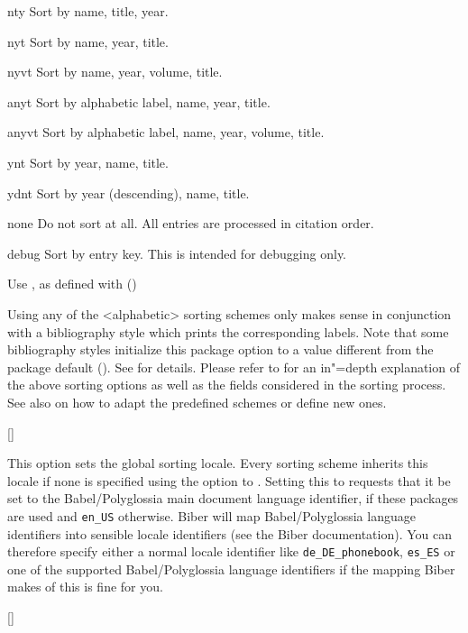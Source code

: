 \documentclass{ltxdockit}[2011/03/25]
\newcommand*{\biber}{Biber\xspace}
\begin{document}
\begin{optionlist}
\begin{valuelist}
\item[nty] Sort by name, title, year.
\item[nyt] Sort by name, year, title.
\item[nyvt] Sort by name, year, volume, title.
\item[anyt] Sort by alphabetic label, name, year, title.
\item[anyvt] Sort by alphabetic label, name, year, volume, title.
\item[ynt] Sort by year, name, title.
\item[ydnt] Sort by year (descending), name, title.
\item[none] Do not sort at all. All entries are processed in citation order.
\item[debug] Sort by entry key. This is intended for debugging only.
\item[\prm{name}] \BiberOnlyMark Use , as defined with  ()
\end{valuelist}

Using any of the <alphabetic> sorting schemes only makes sense in conjunction with a bibliography style which prints the corresponding labels. Note that some bibliography styles initialize this package option to a value different from the package default (). See  for details. Please refer to  for an in"=depth explanation of the above sorting options as well as the fields considered in the sorting process. See also  on how to adapt the predefined schemes or define new ones.

[\BiberOnly]

This option sets the global sorting locale. Every sorting scheme inherits this locale if none is specified using the  option to . Setting this to  requests that it be set to the Babel/Polyglossia main document language identifier, if these packages are used and \texttt{en\_US} otherwise. \biber will map Babel/Polyglossia language identifiers into sensible locale identifiers (see the \biber documentation). You can therefore specify either a normal locale identifier like \texttt{de\_DE\_phonebook}, \texttt{es\_ES} or one of the supported Babel/Polyglossia language identifiers if the mapping \biber makes of this is fine for you.

[\BibTeXOnly]


\end{optionlist}
\end{document}
